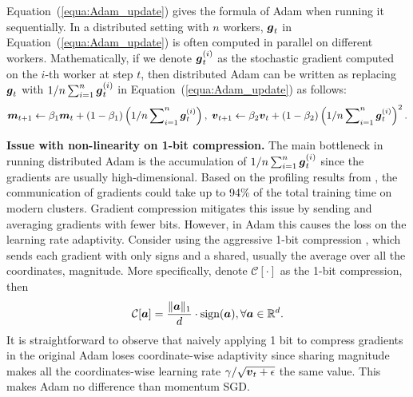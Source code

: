 Equation~(\ref{equa:Adam_update}) gives the formula of Adam when running it sequentially. In a distributed setting with $n$ workers, $\boldsymbol{g}_t$ in Equation~(\ref{equa:Adam_update}) is often computed in parallel on different workers. Mathematically, if we denote $\boldsymbol{g}_t^{(i)}$ as the stochastic gradient computed on the $i$-th worker at step $t$, then distributed Adam can be written as replacing $\boldsymbol{g}_t$ with $1/n\sum_{i=1}^n{\boldsymbol{g}_t^{(i)}}$ in Equation~(\ref{equa:Adam_update}) as follows:
\begin{align*}
\boldsymbol{m}_{t+1} \leftarrow \beta_1\boldsymbol{m}_{t} + (1-\beta_1)\left(1/n\sum\nolimits_{i=1}^n{\boldsymbol{g}_t^{(i)}}\right), \hspace{1mm} \boldsymbol{v}_{t+1} \leftarrow \beta_2\boldsymbol{v}_{t} + (1-\beta_2)\left(1/n\sum\nolimits_{i=1}^n{\boldsymbol{g}_t^{(i)}}\right)^2.
\end{align*}


\textbf{Issue with non-linearity on 1-bit  compression.}
The main bottleneck in running distributed Adam is the accumulation of $1/n\sum\nolimits_{i=1}^{n}\boldsymbol{g}_t^{(i)}$ since the gradients are usually high-dimensional. 
Based on the profiling results from \citep{tang20211,li20211}, the communication of gradients could take up to 94\% of the total training time on modern clusters.
Gradient compression mitigates this issue by sending and averaging gradients with fewer bits. However, in Adam this causes the loss on the learning rate adaptivity. Consider using the aggressive
1-bit compression \citep{liu2018signsgd}, which sends each gradient with only signs and a shared, usually the average over all the coordinates, magnitude. More specifically, denote $\mathcal{C}[\cdot]$ as the 1-bit compression, then
\begin{align}
\label{equa:1bitcompression}
    \mathcal{C}[\boldsymbol{a}] = \frac{\|\boldsymbol{a}\|_1}{d} \cdot \text{sign}(\boldsymbol{a}), \forall \boldsymbol{a}\in\mathbb{R}^d.
\end{align}
It is straightforward to observe that naively applying 1 bit to compress gradients in the original Adam loses coordinate-wise adaptivity since sharing magnitude makes all the coordinates-wise learning rate $\gamma/\sqrt{\boldsymbol{v}_t+\epsilon}$ the same value. This makes Adam no difference than momentum SGD.

